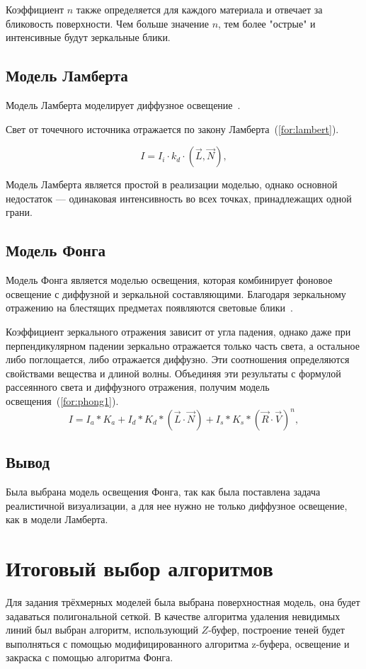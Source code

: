Коэффициент $n$ также определяется для каждого материала и отвечает за бликовость поверхности. Чем больше значение $n$, тем более "острые" и интенсивные будут зеркальные блики.

\subsection{Модель Ламберта}

Модель Ламберта моделирует диффузное освещение~\cite{roders}.

Свет от точечного источника отражается по закону Ламберта~(\ref{for:lambert}). 

\begin{equation}
	\label{for:lambert}
	I = I_i \cdot k_d \cdot (\vec{L}, \vec{N}),
\end{equation}

Модель Ламберта является простой в реализации моделью, однако основной недостаток --- одинаковая интенсивность во всех точках, принадлежащих одной грани.


\subsection{Модель Фонга}

Модель Фонга является моделью освещения, которая комбинирует фоновое освещение с диффузной и зеркальной составляющими. Благодаря зеркальному отражению на блестящих предметах появляются световые блики~\cite{roders}.

Коэффициент зеркального отражения зависит от угла падения, однако даже при перпендикулярном падении зеркально отражается только часть света, а остальное либо поглощается, либо отражается диффузно. Эти соотношения определяются свойствами вещества и длиной волны. Объединяя эти результаты с формулой рассеянного света и диффузного отражения, получим модель освещения~(\ref{for:phong1}).
\begin{equation} 
	\label{for:phong1}
	I = I_a * K_a + I_d * K_d * (\vec{L} \cdot \vec{N}) + I_s * K_s * (\vec{R} \cdot \vec{V})^n,
\end{equation}

\subsection{Вывод}

Была выбрана модель освещения Фонга, так как была поставлена задача реалистичной визуализации, а для нее нужно не только диффузное освещение, как в модели Ламберта.


\section{Итоговый выбор алгоритмов} 

Для задания трёхмерных моделей была выбрана поверхностная модель, она будет задаваться полигональной сеткой. В качестве алгоритма удаления невидимых линий был выбран алгоритм, использующий $Z$-буфер, построение теней будет выполняться с помощью модифицированного алгоритма z-буфера, освещение и закраска с помощью алгоритма Фонга.

